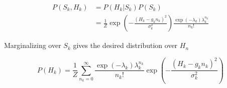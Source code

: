 \documentclass{article}
\begin{document}
\vspace{0.1in}
\begin{align*}
P(S_{k},H_{k}) &= P(H_{k}|S_{k})P(S_{k})\\
&= \frac{1}{Z}\exp\left(-\frac{(H_{k}-g_{k}n_{k})^{2}}{\sigma_{k}^{2}}\right)\frac{\exp\left({-\lambda_{k}}\right)\lambda_{k}^{n_{k}}}{n_{k}!}
\end{align*}
\vspace{0.1in}

Marginalizing over $S_{k}$ gives the desired distribution over $H_{n}$

\begin{equation*}
P(H_{k}) = \frac{1}{Z}\sum_{n_{k}=0}^{\infty}\frac{\exp\left({-\lambda_{k}}\right)\lambda_{k}^{n_{k}}}{n_{k}!}\exp\left(-\frac{(H_{k}-g_{k}n_{k})^{2}}{\sigma_{k}^{2}}\right)
\end{equation*}

\begin{figure}
\centering     %
{}

\end{figure}
\end{document}
